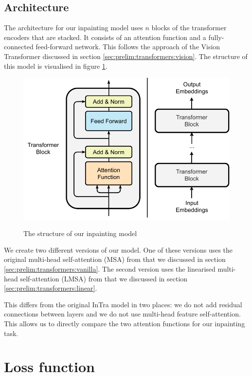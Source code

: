 \subsection{Architecture}

The architecture for our inpainting model uses $n$ blocks of the transformer encoders that are stacked.
It consists of an attention function and a fully-connected feed-forward network. This follows the approach of the Vision Transformer discussed in section \ref{sec:prelim:transformers:vision}. The structure of this model is visualised in figure \ref{fig:experimental-setup:model-structure}.

\begin{figure}[ht!]
\caption{The structure of our inpainting model}
\centering
\includegraphics[width=\textwidth]{imgs/model-structure.pdf}
\label{fig:experimental-setup:model-structure}
\end{figure}

We create two different versions of our model. One of these versions uses the original multi-head self-attention (MSA) from \cite{vaswani_attention_2017} that we discussed in section \ref{sec:prelim:transformers:vanilla}. The second version uses the linearised multi-head self-attention (LMSA) from \cite{katharopoulos_transformers_2020} that we discussed in section \ref{sec:prelim:transformers:linear}.

This differs from the original InTra model in two places: we do not add residual connections between layers and we do not use multi-head feature self-attention. This allows us to directly compare the two attention functions for our inpainting task.

\section{Loss function}
\label{sec:experimental-setup:loss}

